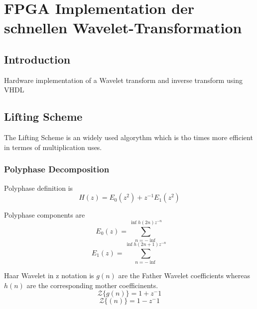 %
%
%
\chapter{FPGA Implementation der schnellen Wavelet-Transformation\label{chapter:fpga}}
\begin{refsection}

\section{Introduction}

Hardware implementation of a Wavelet transform and inverse transform using VHDL


\section{Lifting Scheme}

The Lifting Scheme is an widely used algorythm which is tho times more efficient in termes of multiplication uses. 


\subsection{Polyphase Decomposition}


Polyphase definition is
\begin{equation}
H(z)=E_{0}(z^2)+z^{−1} E_1(z^2)
\end{equation}

Polyphase components are
\begin{equation}
E_0(z) = \sum_{n=-\inf}^{\inf h(2n)z^{-n}}
\end{equation}
\begin{equation}
E_1(z) = \sum_{n=-\inf}^{\inf h(2n+1)z^{-n}}
\end{equation}

Haar Wavelet in z notation is
$g(n)$ are the Father Wavelet coefficients whereas $h(n)$ are the corresponding mother coefficinents. 
\begin{equation}
{\mathcal {Z}} \{g(n)\} = 1 + z^-1
\end{equation}
\begin{equation}
{\mathcal {Z}} \{(n)\} = 1 - z^-1
\end{equation}



\end{refsection}
